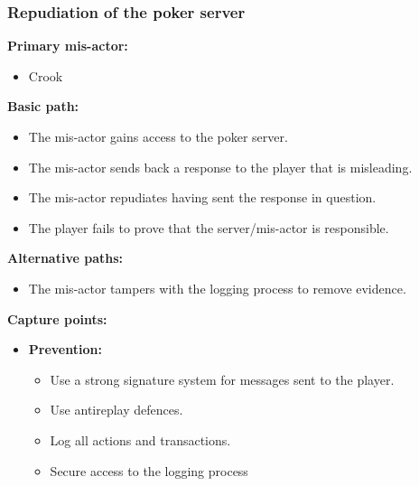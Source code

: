 \documentclass[a4paper,11pt]{report}
\begin{document}
\subsubsection{Repudiation of the poker server}
\label{PokerServerCasesR}
\textbf{Primary mis-actor:}
\begin{itemize}
\item Crook
\end{itemize}
\textbf{Basic path:}
\begin{itemize}
\item The mis-actor gains access to the poker server.
\item The mis-actor sends back a response to the player that is misleading.
\item The mis-actor repudiates having sent the response in question.
\item The player fails to prove that the server/mis-actor is responsible.
\end{itemize}
\textbf{Alternative paths:}
\begin{itemize}
\item The mis-actor tampers with the logging process to remove evidence.
\end{itemize}
\textbf{Capture points:}
\begin{itemize}
\item \textbf{Prevention:}
\begin{itemize}
\item Use a strong signature system for messages sent to the player.
\item Use antireplay defences.
\item Log all actions and transactions.
\item Secure access to the logging process
\end{itemize}
\end{itemize}
\end{document}
